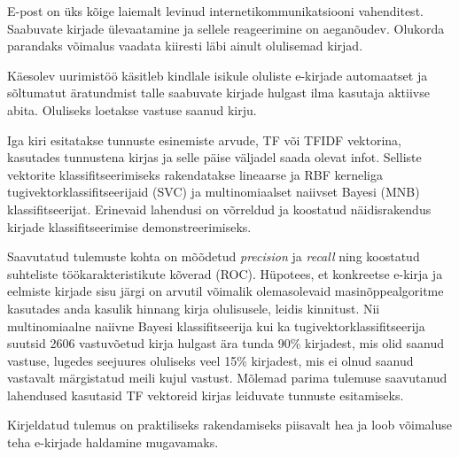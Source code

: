 \documentclass[]{trkuur}
\let\eng\emph
\begin{document}

E-post on üks kõige laiemalt levinud internetikommunikatsiooni
vahenditest. Saabuvate kirjade ülevaatamine ja sellele reageerimine on aeganõudev.
Olukorda parandaks võimalus vaadata kiiresti läbi ainult olulisemad kirjad.

Käesolev uurimistöö käsitleb kindlale isikule oluliste e-kirjade
automaatset ja sõltumatut
äratundmist talle saabuvate kirjade hulgast
ilma kasutaja aktiivse abita.
Oluliseks loetakse vastuse saanud kirju.

Iga kiri esitatakse tunnuste esinemiste arvude, TF või TFIDF vektorina,
kasutades tunnustena kirjas ja selle päise väljadel saada olevat infot.
Selliste vektorite klassifitseerimiseks rakendatakse lineaarse ja RBF
kerneliga tugivektorklassifitseerijaid (SVC) ja multinomiaalset naiivset
Bayesi (MNB) klassifitseerijat. Erinevaid lahendusi on võrreldud ja koostatud
näidisrakendus kirjade klassifitseerimise demonstreerimiseks.

Saavutatud tulemuste kohta on mõõdetud \eng{precision} ja \eng{recall} ning
koostatud suhteliste töökarakteristikute kõverad (ROC).
Hüpotees, et konkreetse e-kirja ja eelmiste kirjade sisu järgi on arvutil võimalik
olemasolevaid masinõppealgoritme kasutades anda kasulik hinnang kirja olulisusele,
leidis kinnitust. Nii multinomiaalne naiivne Bayesi klassifitseerija kui ka
tugivektorklassifitseerija suutsid 2606 vastuvõetud kirja hulgast
ära tunda 90\% kirjadest, mis olid saanud vastuse, lugedes seejuures oluliseks
veel 15\% kirjadest, mis ei olnud saanud vastavalt märgistatud meili kujul vastust.
Mõlemad parima tulemuse saavutanud lahendused kasutasid TF vektoreid kirjas
leiduvate tunnuste esitamiseks.

Kirjeldatud tulemus on praktiliseks rakendamiseks piisavalt hea ja loob võimaluse
teha e-kirjade haldamine mugavamaks.
\end{document}
